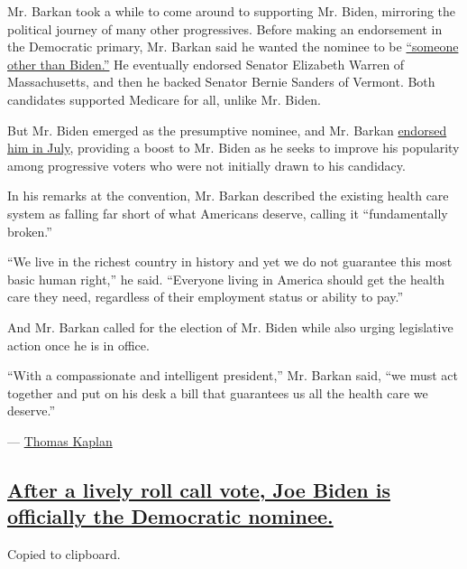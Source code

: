 Mr. Barkan took a while to come around to supporting Mr. Biden,
mirroring the political journey of many other progressives. Before
making an endorsement in the Democratic primary, Mr. Barkan said he
wanted the nominee to be
\href{https://www.nytimes3xbfgragh.onion/2019/09/19/us/ady-barkan-activist-medicare.html}{``someone
other than Biden.''} He eventually endorsed Senator Elizabeth Warren of
Massachusetts, and then he backed Senator Bernie Sanders of Vermont.
Both candidates supported Medicare for all, unlike Mr. Biden.

But Mr. Biden emerged as the presumptive nominee, and Mr. Barkan
\href{https://www.nytimes3xbfgragh.onion/2020/07/08/us/politics/ady-barkan-biden-endorsement.html}{endorsed
him in July}, providing a boost to Mr. Biden as he seeks to improve his
popularity among progressive voters who were not initially drawn to his
candidacy.

In his remarks at the convention, Mr. Barkan described the existing
health care system as falling far short of what Americans deserve,
calling it ``fundamentally broken.''

``We live in the richest country in history and yet we do not guarantee
this most basic human right,'' he said. ``Everyone living in America
should get the health care they need, regardless of their employment
status or ability to pay.''

And Mr. Barkan called for the election of Mr. Biden while also urging
legislative action once he is in office.

``With a compassionate and intelligent president,'' Mr. Barkan said,
``we must act together and put on his desk a bill that guarantees us all
the health care we deserve.''

--- \href{https://www.nytimes3xbfgragh.onion/by/thomas-kaplan}{Thomas
Kaplan}

\hypertarget{after-a-lively-roll-call-vote-joe-biden-is-officially-the-democratic-nominee}{%
\subsection{\texorpdfstring{\protect\hyperlink{after-a-lively-roll-call-vote-joe-biden-is-officially-the-democratic-nominee}{After
a lively roll call vote, Joe Biden is officially the Democratic
nominee.}}{After a lively roll call vote, Joe Biden is officially the Democratic nominee.}}\label{after-a-lively-roll-call-vote-joe-biden-is-officially-the-democratic-nominee}}

Copied to clipboard.

